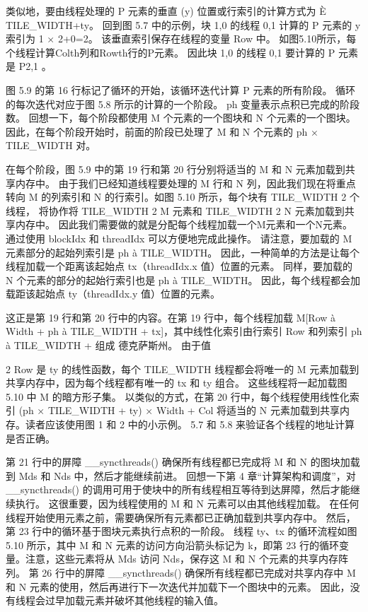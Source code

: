 类似地，要由线程处理的 P 元素的垂直 (y) 位置或行索引的计算方式为 È TILE\_WIDTH+ty。 回到图 5.7 中的示例，块 1,0 的线程 0,1 计算的 P 元素的 y 索引为 1 × 2+0=2。 该垂直索引保存在线程的变量 Row 中。 如图5.10所示，每个线程计算Colth列和Rowth行的P元素。 因此块 1,0 的线程 0,1 要计算的 P 元素是 P2,1 。

图 5.9 的第 16 行标记了循环的开始，该循环迭代计算 P 元素的所有阶段。 循环的每次迭代对应于图 5.8 所示的计算的一个阶段。 ph 变量表示点积已完成的阶段数。 回想一下，每个阶段都使用 M 个元素的一个图块和 N 个元素的一个图块。 因此，在每个阶段开始时，前面的阶段已处理了 M 和 N 个元素的 ph × TILE\_WIDTH 对。

在每个阶段，图 5.9 中的第 19 行和第 20 行分别将适当的 M 和 N 元素加载到共享内存中。 由于我们已经知道线程要处理的 M 行和 N 列，因此我们现在将重点转向 M 的列索引和 N 的行索引。如图 5.10 所示，每个块有 TILE\_WIDTH 2 个线程， 将协作将 TILE\_WIDTH 2 M 元素和 TILE\_WIDTH 2 N 元素加载到共享内存中。 因此我们需要做的就是分配每个线程加载一个M元素和一个N元素。 通过使用 blockIdx 和 threadIdx 可以方便地完成此操作。 请注意，要加载的 M 元素部分的起始列索引是 ph à TILE\_WIDTH。 因此，一种简单的方法是让每个线程加载一个距离该起始点 tx（threadIdx.x 值）位置的元素。 同样，要加载的 N 个元素的部分的起始行索引也是 ph à TILE\_WIDTH。 因此，每个线程都会加载距该起始点 ty（threadIdx.y 值）位置的元素。

这正是第 19 行和第 20 行中的内容。在第 19 行中，每个线程加载 M[Row à Width + ph à TILE\_WIDTH + tx]，其中线性化索引由行索引 Row 和列索引 ph à TILE\_WIDTH + 组成 德克萨斯州。 由于值

2 Row 是 ty 的线性函数，每个 TILE\_WIDTH 线程都会将唯一的 M 元素加载到共享内存中，因为每个线程都有唯一的 tx 和 ty 组合。 这些线程将一起加载图 5.10 中 M 的暗方形子集。 以类似的方式，在第 20 行中，每个线程使用线性化索引 (ph × TILE\_WIDTH + ty) × Width + Col 将适当的 N 元素加载到共享内存。读者应该使用图 1 和 2 中的小示例。 5.7 和 5.8 来验证各个线程的地址计算是否正确。

第 21 行中的屏障 \_\_syncthreads() 确保所有线程都已完成将 M 和 N 的图块加载到 Mds 和 Nds 中，然后才能继续前进。 回想一下第 4 章“计算架构和调度”，对 \_\_syncthreads() 的调用可用于使块中的所有线程相互等待到达屏障，然后才能继续执行。 这很重要，因为线程使用的 M 和 N 元素可以由其他线程加载。 在任何线程开始使用元素之前，需要确保所有元素都已正确加载到共享内存中。 然后，第 23 行中的循环基于图块元素执行点积的一阶段。 线程 ty、tx 的循环流程如图 5.10 所示，其中 M 和 N 元素的访问方向沿箭头标记为 k，即第 23 行的循环变量。注意，这些元素将从 Mds 访问 Nds，保存这 M 和 N 个元素的共享内存阵列。 第 26 行中的屏障 \_\_syncthreads() 确保所有线程都已完成对共享内存中 M 和 N 元素的使用，然后再进行下一次迭代并加载下一个图块中的元素。 因此，没有线程会过早加载元素并破坏其他线程的输入值。

